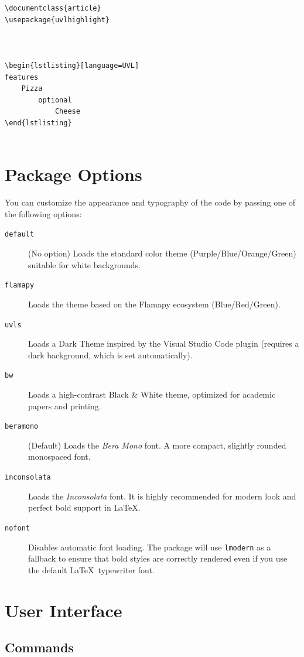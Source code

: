 {\scriptsize
\begin{verbatim}
\documentclass{article}
\usepackage{uvlhighlight}



\begin{lstlisting}[language=UVL]
features
    Pizza
        optional
            Cheese
\end{lstlisting}


\end{verbatim}
}

\section{Package Options}
You can customize the appearance and typography of the \UVL code by passing one of the following options:

\begin{description}
    \item[\texttt{default}] (No option) Loads the standard color theme (Purple/Blue/Orange/Green) suitable for white backgrounds.
    \item[\texttt{flamapy}] Loads the theme based on the Flamapy ecosystem (Blue/Red/Green).
    \item[\texttt{uvls}] Loads a Dark Theme inspired by the Visual Studio Code \UVL plugin (requires a dark background, which is set automatically).
    \item[\texttt{bw}] Loads a high-contrast Black \& White theme, optimized for academic papers and printing.
    \item[\texttt{beramono}] (Default) Loads the \textit{Bera Mono} font. A more compact, slightly rounded monospaced font.
    \item[\texttt{inconsolata}] Loads the \textit{Inconsolata} font. It is highly recommended for modern look and perfect bold support in \LaTeX.
    \item[\texttt{nofont}] Disables automatic font loading. The package will use \texttt{lmodern} as a fallback to ensure that bold styles are correctly rendered even if you use the default \LaTeX\ typewriter font.
\end{description}

\section{User Interface}

\subsection{Commands}

